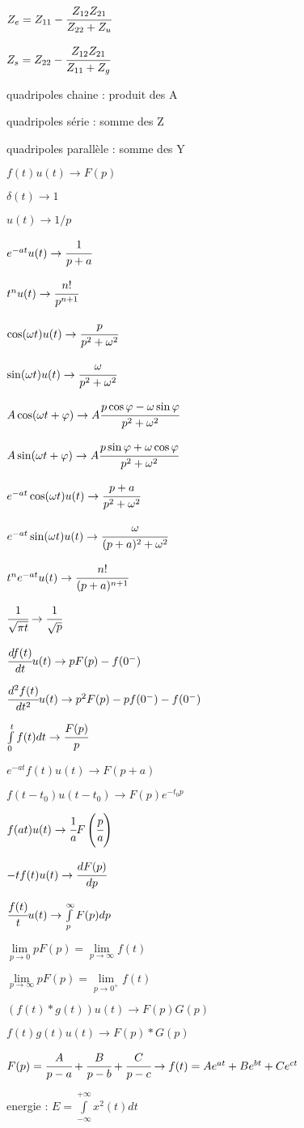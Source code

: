 \documentclass[10pt,twocolumn,a4paper]{article}
\begin{document}
$Z_e = Z_{11} - \cfrac{Z_{12}Z_{21}}{Z_{22} + Z_u}$

$Z_s = Z_{22} - \cfrac{Z_{12}Z_{21}}{Z_{11} + Z_g}$

quadripoles chaine : produit des A

quadripoles série : somme des Z

quadripoles parallèle : somme des Y

$f(t)u(t) \rightarrow F(p)$

$\delta (t) \rightarrow 1 $

$u(t) \rightarrow 1/p$

$e^{-at}u(t) \rightarrow \cfrac{1}{p+a}$

$t^nu(t) \rightarrow \cfrac{n!}{p^{n+1}}$

$\cos(\omega t) u(t) \rightarrow \cfrac{p}{p^2 + \omega^2}$

$\sin(\omega t) u(t) \rightarrow \cfrac{\omega}{p^2 + \omega^2}$

$A\cos(\omega t + \varphi) \rightarrow A \cfrac{p\cos \varphi - \omega\sin\varphi}{p^2 + \omega^2}$

$A\sin(\omega t + \varphi) \rightarrow A \cfrac{p\sin \varphi + \omega\cos\varphi}{p^2 + \omega^2}$

$e^{-at}\cos(\omega t) u(t) \rightarrow \cfrac{p+a}{p^2 + \omega^2}$

$e^{-at}\sin(\omega t) u(t) \rightarrow \cfrac{\omega}{(p+a)^2 + \omega^2}$

$t^ne^{-at}u(t) \rightarrow \cfrac{n!}{(p+a)^{n+1}}$

$\cfrac{1}{\sqrt{\pi t}} \rightarrow \cfrac{1}{\sqrt{p}}$

$\cfrac{df(t)}{dt}u(t) \rightarrow pF(p) - f(0^-)$

$\cfrac{d^2f(t)}{dt^2} u(t) \rightarrow p^2F(p) - pf(0^-) - f(0^-)$

$\int \limits_{0}^{t}{f(t)dt} \rightarrow \cfrac{F(p)}{p}$

$e^{-at}f(t)u(t) \rightarrow F(p+a)$

$f(t-t_0)u(t-t_0) \rightarrow F(p)e^{-t_0p}$

$f(at)u(t) \rightarrow \cfrac{1}{a}F\left(\cfrac{p}{a}\right)$

$-tf(t)u(t) \rightarrow \cfrac{dF(p)}{dp} $

$\cfrac{f(t)}{t} u(t) \rightarrow \int \limits_{p}^{\infty}{F(p)dp} $

$ \lim \limits_{p \to 0} pF(p) = \lim \limits_{p \to \infty} f(t)$


$ \lim \limits_{p \to \infty} pF(p) = \lim \limits_{p \to 0^+} f(t)$

$(f(t)\ast g(t)) u(t) \rightarrow F(p)G(p)$

$f(t)g(t) u(t) \rightarrow F(p)\ast G(p)$

$F(p) = \cfrac{A}{p-a} + \cfrac{B}{p-b} + \cfrac{C}{p-c} \rightarrow f(t) = Ae^{at}+Be^{bt}+Ce^{ct}$

energie : $E = \int \limits_{-\infty}^{+\infty} x^2(t)dt$
\end{document}
